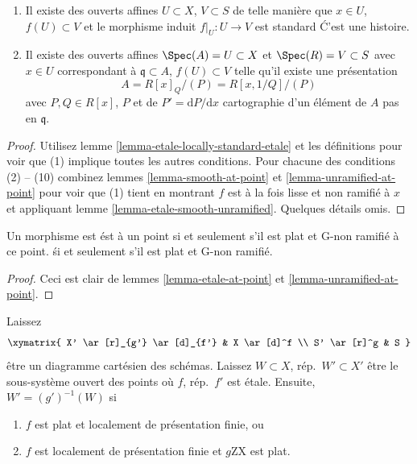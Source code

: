 \begin{lemma}
\begin{enumerate}
$$\begin{matrix}
\partial f_1/\partial x_n &
\partial f_2/\partial x_n &
\ldots &
\partial f_n/\partial x_n
\end{matrix}
\right)
$$
cartographie d'un élément de $A$ pas en $\mathfrak q$.
\item Il existe des ouverts affines $U \subset X$, $V \subset S$ de telle manière que $x \in U$, $f(U) \subset V$ et le morphisme induit $f|_U : U \to V$ est standard \'C'est une histoire.
\item Il existe des ouverts affines $\Spec(A) = U \subset X$
et $\Spec(R) = V \subset S$ avec $x \in U$ correspondant à $\mathfrak q \subset A$, $f(U) \subset V$
telle qu'il existe une présentation
$$
A = R[x]_Q/(P) = R[x, 1/Q]/(P)
$$
avec $P, Q \in R[x]$, $P$ et de $P' = \text{d}P/\text{d}x$ cartographie d'un élément de $A$ pas en $\mathfrak q$.

\end{enumerate}

\end{lemma}

\begin{proof}
Utilisez lemme \ref{lemma-etale-locally-standard-etale} et les définitions pour voir que (1) implique toutes les autres conditions. Pour chacune des conditions (2) -- (10) combinez lemmes \ref{lemma-smooth-at-point} et \ref{lemma-unramified-at-point} pour voir que (1) tient en montrant $f$ est à la fois lisse et non ramifié à $x$ et appliquant lemme \ref{lemma-etale-smooth-unramified}. Quelques détails omis.
\end{proof}

\begin{lemma}

\label{lemma-flat-unramified-etale}

Un morphisme est \'est à un point si et seulement s'il est plat et G-non ramifié à ce point. \'si et seulement s'il est plat et G-non ramifié.

\end{lemma}

\begin{proof}
Ceci est clair de lemmes \ref{lemma-etale-at-point} et \ref{lemma-unramified-at-point}.
\end{proof}

\begin{lemma}

\label{lemma-set-points-where-fibres-etale}
Laissez $$
\xymatrix{
X' \ar[r]_{g'} \ar[d]_{f'} & X \ar[d]^f \\
S' \ar[r]^g & S
}
$$ être un diagramme cartésien des schémas. Laissez $W \subset X$, rép.\ $W' \subset X'$ être le sous-système ouvert des points où $f$, rép.\ $f'$ est \'etale. Ensuite, $W' = (g')^{-1}(W)$ si
\begin{enumerate}
\item $f$ est plat et localement de présentation finie, ou
\item $f$ est localement de présentation finie et $g$ZX est plat.
\end{enumerate}

\end{lemma}

